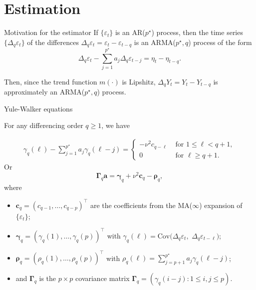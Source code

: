 \documentclass[10pt, handout]{beamer}
\newcommand{\Cov}{\mathrm{Cov}}
\begin{document}
\section{Estimation}

\begin{frame}{Motivation for the estimator}
If $\{\varepsilon_t\}$ is an AR($p^\star$) process, then the time series $\{ \Delta_q \varepsilon_t \}$ of the differences $\Delta_q \varepsilon_t = \varepsilon_t - \varepsilon_{t-q}$ is an ARMA($p^\star,q$) process of the form 
\begin{equation*}
\Delta_q \varepsilon_t - \sum_{j=1}^{p^\star} a_j \Delta_q \varepsilon_{t-j} = \eta_t - \eta_{t-q}. 
\end{equation*}\pause

Then, since the trend function $m(\cdot)$ is Lipshitz, $\Delta_q Y_{t} = Y_{t} - Y_{t-q}$ is approximately an ARMA($p^\star,q$) process.
\end{frame} 


\begin{frame}{Yule-Walker equations}

For any differencing order $q \geq 1$, we have

\begin{align*}
	\gamma_q(\ell) - \sum_{j=1}^{p^\star} a_j \gamma_q(\ell - j) = \begin{cases}
	-\nu^2 c_{q - \ell} &\text{ for } 1\leq \ell < q+1,\\
	0 &\text{ for } \ell \geq q+1.
	\end{cases}
\end{align*}
Or 
\begin{equation*}\label{YU-eq}
\boldsymbol{\Gamma}_q \boldsymbol{a} = \boldsymbol{\gamma}_q + \nu^2 \boldsymbol{c}_q - \boldsymbol{\rho}_q,  
\end{equation*} 
where
\vspace{-3mm}
\begin{itemize}
	\item $\boldsymbol{c}_q = (c_{q-1},\dots,c_{q-p})^\top$ are the coefficients from the MA($\infty$) expansion of $\{ \varepsilon_t \}$;\pause
	\item $\boldsymbol{\gamma}_q = (\gamma_q(1),\dots,\gamma_q(p))^\top$ with $\gamma_q(\ell) = \Cov(\Delta_q \varepsilon_t,$ $\Delta_q \varepsilon_{t-\ell})$;\pause
	\item $\boldsymbol{\rho}_q = (\rho_q(1),\dots,\rho_q(p))^\top$ with $\rho_q(\ell) = \sum_{j=p+1}^{p^\star}a_j \gamma_q(\ell-j)$;\pause
	\item and $\boldsymbol{\Gamma}_q$ is the $p \times p$ covariance matrix $\boldsymbol{\Gamma}_q = (\gamma_q(i-j): 1 \le i,j \le p)$.
\end{itemize}
\end{frame}
\end{document}
